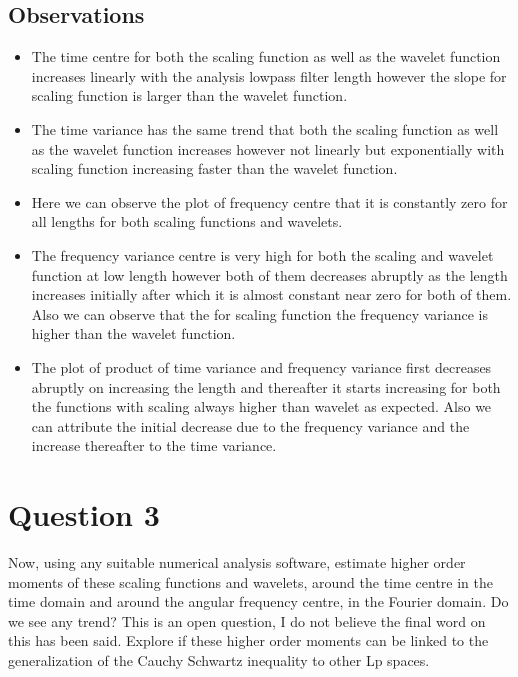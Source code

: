 \documentclass{article}
\begin{document}
\subsection{Observations}

\begin{itemize}

\item The time centre for both the scaling function as well as the wavelet function increases linearly with the analysis lowpass filter length however the slope for scaling function is larger than the wavelet function.

\item The time variance has the same trend that both the scaling function as well as the wavelet function increases however not linearly but exponentially with scaling function increasing faster than the wavelet function.

\item Here we can observe the plot of frequency centre that it is constantly zero for all lengths for both scaling functions and wavelets.

\item The frequency variance centre is very high for both the scaling and wavelet function at low length however both of them decreases abruptly as the length increases initially after which it is almost constant near zero for both of them. Also we can observe that the for scaling function the frequency variance is higher than the wavelet function.

\item The plot of product of time variance and frequency variance first decreases abruptly on increasing the length and thereafter it starts increasing for both the functions with scaling always higher than wavelet as expected. Also we can attribute the initial decrease due to the frequency variance and the increase thereafter to the time variance.

\end{itemize}


\section{Question 3}
Now, using any suitable numerical analysis software, estimate higher order moments of these scaling functions and wavelets, around the time centre in the time domain and around the angular frequency centre, in the Fourier domain. Do we see any trend? This is an open question, I do not believe the final word on this has been said. Explore if these higher order moments can be linked to the generalization of the Cauchy Schwartz inequality to other Lp spaces.
\end{document}
